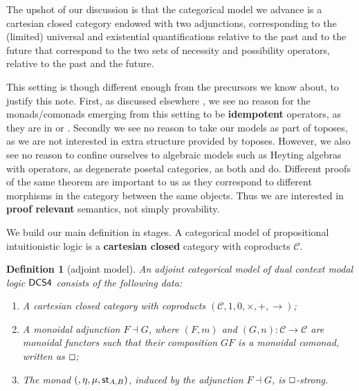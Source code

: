 \documentclass{article}
\let\Diamond\relax
\let\mto\to
\let\to\relax
\newcommand{\to}{\rightarrow}
\renewcommand{\Box}{\oblong}
\newcommand{\cat}[1]{\mathcal{#1}}
\newcommand{\pd}[0]{\times}
\newcommand{\ihom}[0]{\rightarrow}
\newcommand{\st}[2]{\mathsf{st}_{#1,#2}}
\newtheorem{definition}[theorem]{Definition}
\begin{document}
The upshot of our discussion is that the categorical model we advance is a cartesian closed category endowed with two adjunctions, corresponding to the (limited) universal and existential quantifications relative to the past and to the future that correspond to the two sets of  necessity and possibility operators, relative to the past and the future.

This setting is though  different enough from the precursors we know about, to justify this note. First, as discussed elsewhere \cite{bierman2000}, we see no reason for the monads/comonads emerging from this setting to be \textbf{idempotent} operators, as they are in \cite{ghilardi1988} or \cite{makkai1995}. Secondly we see no reason to take our models as part of toposes, as we are not  interested in extra structure provided by toposes. 
However, we also see no reason to confine ourselves to algebraic models such as Heyting algebras with operators, as degenerate posetal categories, as both \cite{dziketal2012} and  \cite{Menni:2014} do. Different proofs of the same theorem are important to us as they correspond to different morphisms in the category between the same objects. Thus we are interested in \textbf{proof relevant} semantics, not simply provability.

We build our main definition in stages. A categorical model of propositional intuitionistic  logic is a \textbf{cartesian closed} category with coproducts $\cat{C}$.

\begin{definition}[adjoint model]
  \label{def:CS4-single-adjoint-cat-model}
  An adjoint categorical model of dual context modal logic $\sf{DCS4}$ consists of the following data:
  \begin{enumerate}
  \item A cartesian closed category with coproducts $(\cat{C},1,0,\pd,+,\ihom)$;
  \item 
    A monoidal adjunction  $F \dashv G$, where $(F,m)$ and  $(G,n)\colon \cat{C} \mto \cat{C}$ are monoidal functors such that their composition $GF$ is a monoidal comonad, written as $\Box$;
 \item The  monad $(\Diamond, \eta, \mu, \st{A}{B})$, induced by the adjunction $F \dashv G$,   is $\Box$-strong.
  \end{enumerate}
\end{definition}
\end{document}
